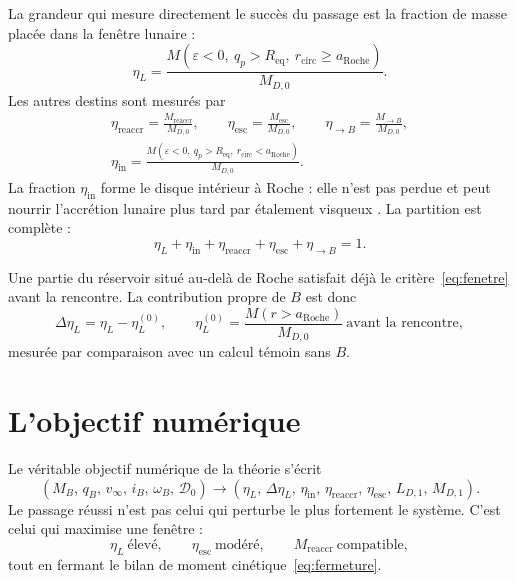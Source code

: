 \documentclass[11pt,a4paper,openany]{report}
\newcommand{\Req}{R_{\mathrm{eq}}}
\newcommand{\aR}{a_{\mathrm{Roche}}}
\begin{document}
La grandeur qui mesure directement le succès du passage est la fraction de masse placée dans la
fenêtre lunaire :
\begin{equation}
\boxed{\;\eta_L=\frac{M\!\left(\varepsilon<0,\ q_p>\Req,\ r_{\mathrm{circ}}\ge\aR\right)}{M_{D,0}}.\;}
\label{eq:etaL}
\end{equation}
Les autres destins sont mesurés par
\begin{equation}
\begin{gathered}
\eta_{\mathrm{reaccr}}=\frac{M_{\mathrm{reaccr}}}{M_{D,0}},\qquad
\eta_{\mathrm{esc}}=\frac{M_{\mathrm{esc}}}{M_{D,0}},\qquad
\eta_{\to B}=\frac{M_{\to B}}{M_{D,0}},\\[4pt]
\eta_{\mathrm{in}}=\frac{M(\varepsilon<0,\ q_p>\Req,\ r_{\mathrm{circ}}<\aR)}{M_{D,0}}.
\end{gathered}
\label{eq:etas}
\end{equation}
La fraction $\eta_{\mathrm{in}}$ forme le disque intérieur à Roche : elle n'est pas perdue et peut
nourrir l'accrétion lunaire plus tard par étalement visqueux \cite{SalmonCanup2012}. La partition
est complète :
\begin{equation}
\boxed{\;\eta_L+\eta_{\mathrm{in}}+\eta_{\mathrm{reaccr}}+\eta_{\mathrm{esc}}+\eta_{\to B}=1.\;}
\label{eq:partition}
\end{equation}

Une partie du réservoir situé au-delà de Roche satisfait déjà le critère~\eqref{eq:fenetre} avant la
rencontre. La contribution propre de $B$ est donc
\begin{equation}
\Delta\eta_L=\eta_L-\eta_L^{(0)},\qquad
\eta_L^{(0)}=\frac{M(r>\aR)}{M_{D,0}}\ \text{avant la rencontre},
\label{eq:DeltaetaL}
\end{equation}
mesurée par comparaison avec un calcul témoin sans $B$.

\section{L'objectif numérique}

Le véritable objectif numérique de la théorie s'écrit
\begin{equation}
\boxed{\;\left(M_B,\,q_B,\,v_\infty,\,i_B,\,\omega_B,\,\mathcal{D}_0\right)\longrightarrow
\left(\eta_L,\,\Delta\eta_L,\,\eta_{\mathrm{in}},\,\eta_{\mathrm{reaccr}},\,\eta_{\mathrm{esc}},\,
L_{D,1},\,M_{D,1}\right).\;}
\label{eq:objectif}
\end{equation}
Le passage réussi n'est pas celui qui perturbe le plus fortement le système. C'est celui qui
maximise une fenêtre :
\begin{equation}
\boxed{\;\eta_L\ \text{élevé},\qquad \eta_{\mathrm{esc}}\ \text{modéré},\qquad
M_{\mathrm{reaccr}}\ \text{compatible},\;}
\label{eq:fenetre-succes}
\end{equation}
tout en fermant le bilan de moment cinétique~\eqref{eq:fermeture}.
\end{document}
